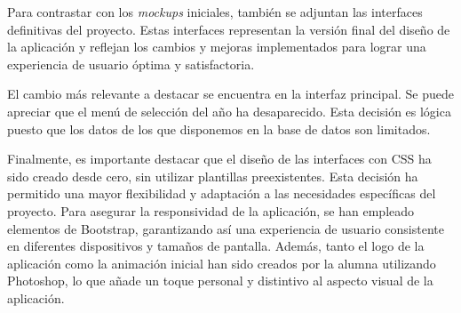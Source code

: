 
Para contrastar con los \textit{mockups} iniciales, también se adjuntan las interfaces definitivas del proyecto. Estas interfaces representan la versión final del diseño de la aplicación y reflejan los cambios y mejoras implementados para lograr una experiencia de usuario óptima y satisfactoria. 

El cambio más relevante a destacar se encuentra en la interfaz principal. Se puede apreciar que el menú de selección del año ha desaparecido. Esta decisión es lógica puesto que los datos de los que disponemos en la base de datos son limitados. 


Finalmente, es importante destacar que el diseño de las interfaces con CSS ha sido creado desde cero, sin utilizar plantillas preexistentes. Esta decisión ha permitido una mayor flexibilidad y adaptación a las necesidades específicas del proyecto. Para asegurar la responsividad de la aplicación, se han empleado elementos de Bootstrap, garantizando así una experiencia de usuario consistente en diferentes dispositivos y tamaños de pantalla. Además, tanto el logo de la aplicación como la animación inicial han sido creados por la alumna utilizando Photoshop, lo que añade un toque personal y distintivo al aspecto visual de la aplicación.